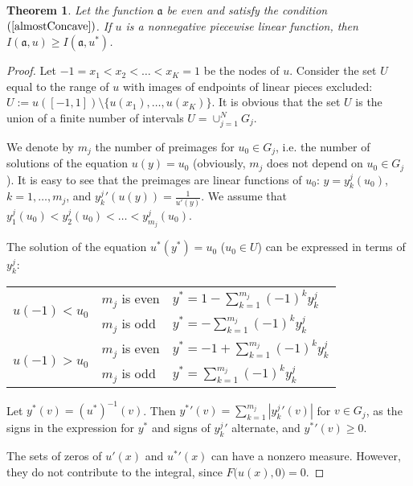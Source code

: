 \documentclass[12pt]{article}
\newcommand{\abs}[1]{\left\vert#1\right\vert}
\renewcommand{\ge}{\geqslant}
\newtheorem{thm}{Theorem}
\begin{document}
\begin{thm}
\label{linth}
Let the function $\mathfrak a$ be even and satisfy the condition $(\ref{almostConcave})$.
If $u$ is a nonnegative piecewise linear function, then $I(\mathfrak a, u) \ge I(\mathfrak a, u^*)$.
\end{thm}

\begin{proof}
Let $-1 = x_1 < x_2 < \dots < x_K = 1$ be the nodes of $u$.
Consider the set $U$ equal to the range of $u$ with images of endpoints of linear pieces excluded:
$U := u( [-1, 1] ) \setminus \{ u(x_1), \dots, u(x_K) \}$.
It is obvious that the set $U$ is the union of a finite number of intervals $U = \cup_{j = 1}^N G_j$.

We denote by $m_j$ the number of preimages for $u_0 \in G_j$,
i.e. the number of solutions of the equation $u(y) = u_0$
(obviously, $m_j$ does not depend on $u_0 \in G_j$).
It is easy to see that the preimages are linear functions of $u_0$:
$y = y_k^j(u_0)$, $k = 1, \dots, m_j$,
and $y_k^j{}'(u(y)) = \frac{1}{u'(y)}$.
We assume that $y_1^j(u_0) < y_2^j(u_0) < \dots < y_{m_j}^j(u_0)$.

The solution of the equation $u^*(y^*)=u_0$ ($u_0 \in U$) can be expressed in terms of $y_k^j$:

\begin{center}
\begin{tabular}{l|l|l} 
\multirow{2}{*}{$u(-1)<u_0$ \rule[-34pt]{0pt}{65pt}} & $m_j$ is even & $y^*=1-\sum\limits_{k=1}^{m_j} (-1)^k y_k^j$ \rule[-17pt]{0pt}{40pt} \\
                                                     & $m_j$ is odd  & $y^*=-\sum\limits_{k=1}^{m_j} (-1)^k y_k^j$ \rule[-17pt]{0pt}{40pt} \\ \hline
\multirow{2}{*}{$u(-1)>u_0$ \rule[-34pt]{0pt}{65pt}} & $m_j$ is even & $y^*=-1+\sum\limits_{k=1}^{m_j} (-1)^k y_k^j$ \rule[-17pt]{0pt}{40pt} \\
                                                     & $m_j$ is odd  & $y^*=\sum\limits_{k=1}^{m_j} (-1)^k y_k^j$ \rule[-17pt]{0pt}{40pt} \\ 
\end{tabular}
\end{center}

Let $y^*(v) = (u^*)^{-1}(v)$.
Then $y^*{}'(v) = \sum_{k=1}^{m_j} \abs{y_k^j{}'(v)}$ for $v \in G_j$, as the signs in the expression for
$y^*$ and signs of $y_k^j{}'$ alternate, and $y^*{}'(v)\ge 0$.

The sets of zeros of $u'(x)$ and $u^*{}'(x)$ can have a nonzero measure.
However, they do not contribute to the integral, since $F\big(u(x), 0\big) = 0$.


\end{proof}
\end{document}
